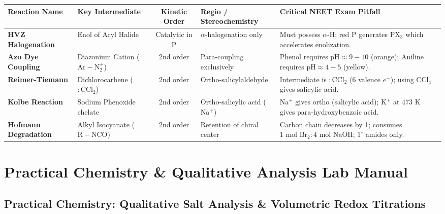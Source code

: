 \documentclass[10pt,twoside,openright]{book}
\begin{document}
\begin{center}
\scriptsize
\renewcommand{\arraystretch}{1.08}
{\scriptsize\setlength{\tabcolsep}{2.0pt}
\begin{tabularx}{\linewidth}{|L|L|c|L|L|}
\hline
\textbf{Reaction Name} & \textbf{Key Intermediate} & \textbf{Kinetic Order} & \textbf{Regio / Stereochemistry} & \textbf{Critical NEET Exam Pitfall} \\
\hline
\textbf{HVZ Halogenation} & Enol of Acyl Halide & Catalytic in $\mathrm{P}$ & $\alpha$-halogenation only & Must possess $\alpha$-H; red $\mathrm{P}$ generates $\mathrm{PX_3}$ which accelerates enolization. \\
\hline
\textbf{Azo Dye Coupling} & Diazonium Cation ($\mathrm{Ar-N_2^+}$) & 2nd order & Para-coupling exclusively & Phenol requires $\mathrm{pH} \approx 9-10$ (orange); Aniline requires $\mathrm{pH} \approx 4-5$ (yellow). \\
\hline
\textbf{Reimer-Tiemann} & Dichlorocarbene ($:\mathrm{CCl_2}$) & 2nd order & Ortho-salicylaldehyde & Intermediate is $:\mathrm{CCl_2}$ (6 valence $e^-$); using $\mathrm{CCl_4}$ gives salicylic acid. \\
\hline
\textbf{Kolbe Reaction} & Sodium Phenoxide chelate & 2nd order & Ortho-salicylic acid ($\mathrm{Na^+}$) & $\mathrm{Na^+}$ gives ortho (salicylic acid); $\mathrm{K^+}$ at $473\text{ K}$ gives para-hydroxybenzoic acid. \\
\hline
\textbf{Hofmann Degradation} & Alkyl Isocyanate ($\mathrm{R-NCO}$) & 2nd order & Retention of chiral center & Carbon chain decreases by 1; consumes $1\text{ mol } \mathrm{Br_2} : 4\text{ mol } \mathrm{NaOH}$; $1^\circ$ amides only. \\
\hline
\end{tabularx}}
\end{center}

\part{Practical Chemistry \& Qualitative Analysis Lab Manual}

\chapter{Practical Chemistry: Qualitative Salt Analysis \& Volumetric Redox Titrations}
\end{document}
